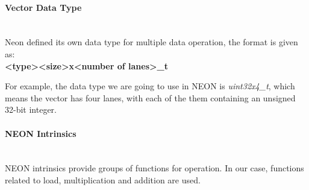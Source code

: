 \paragraph{Vector Data Type}
~\\
Neon defined its own data type\cite{DataType} for multiple data operation, the format is given as:
~\\ 
\textbf{ \textless type\textgreater \textless size\textgreater x\textless number of lanes\textgreater\_t}

For example, the data type we are going to use in NEON is \emph{uint32x4\_t}, 
which means the vector has four lanes, 
with each of the them containing an unsigned 32-bit integer. 

\paragraph{NEON Intrinsics}
~\\
NEON intrinsics \cite{Intrinsics} provide groups of functions for operation. 
In our case, functions related to load, multiplication and addition are used. 

